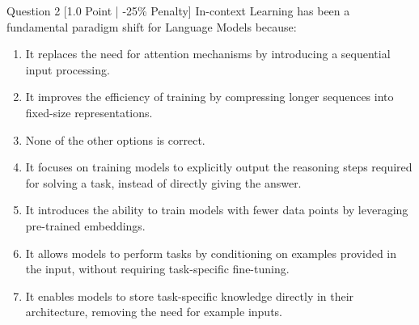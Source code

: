 \documentclass[11pt,a4paper]{article}
\begin{document}
\begin{questionbox}{Question 2 \hfill [1.0 Point | -25\% Penalty]}
In-context Learning has been a fundamental paradigm shift for Language Models because:
\begin{enumerate}[label=(\alph*)]
    \item It replaces the need for attention mechanisms by introducing a sequential input processing.
    \item It improves the efficiency of training by compressing longer sequences into fixed-size representations.
    \item None of the other options is correct.
    \item It focuses on training models to explicitly output the reasoning steps required for solving a task, instead of directly giving the answer.
    \item It introduces the ability to train models with fewer data points by leveraging pre-trained embeddings.
    \item It allows models to perform tasks by conditioning on examples provided in the input, without requiring task-specific fine-tuning.
    \item It enables models to store task-specific knowledge directly in their architecture, removing the need for example inputs.
\end{enumerate}
\end{questionbox}
\end{document}
